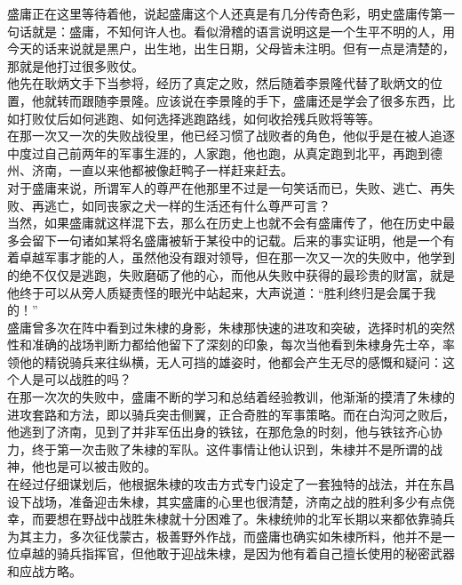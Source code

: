 \begin{multicols}{\theparacolNo}
盛庸正在这里等待着他，说起盛庸这个人还真是有几分传奇色彩，明史盛庸传第一句话就是：盛庸，不知何许人也。看似滑稽的语言说明这是一个生平不明的人，用今天的话来说就是黑户，出生地，出生日期，父母皆未注明。但有一点是清楚的，那就是他打过很多败仗。\\

他先在耿炳文手下当参将，经历了真定之败，然后随着李景隆代替了耿炳文的位置，他就转而跟随李景隆。应该说在李景隆的手下，盛庸还是学会了很多东西，比如打败仗后如何逃跑、如何选择逃跑路线，如何收拾残兵败将等等。\\

在那一次又一次的失败战役里，他已经习惯了战败者的角色，他似乎是在被人追逐中度过自己前两年的军事生涯的，人家跑，他也跑，从真定跑到北平，再跑到德州、济南，一直以来他都被像赶鸭子一样赶来赶去。\\

对于盛庸来说，所谓军人的尊严在他那里不过是一句笑话而已，失败、逃亡、再失败、再逃亡，如同丧家之犬一样的生活还有什么尊严可言？\\

当然，如果盛庸就这样混下去，那么在历史上也就不会有盛庸传了，他在历史中最多会留下一句诸如某将名盛庸被斩于某役中的记载。后来的事实证明，他是一个有着卓越军事才能的人，虽然他没有跟对领导，但在那一次又一次的失败中，他学到的绝不仅仅是逃跑，失败磨砺了他的心，而他从失败中获得的最珍贵的财富，就是他终于可以从旁人质疑责怪的眼光中站起来，大声说道：“胜利终归是会属于我的！”\\

盛庸曾多次在阵中看到过朱棣的身影，朱棣那快速的进攻和突破，选择时机的突然性和准确的战场判断力都给他留下了深刻的印象，每次当他看到朱棣身先士卒，率领他的精锐骑兵来往纵横，无人可挡的雄姿时，他都会产生无尽的感慨和疑问：这个人是可以战胜的吗？\\

在那一次次的失败中，盛庸不断的学习和总结着经验教训，他渐渐的摸清了朱棣的进攻套路和方法，即以骑兵突击侧翼，正合奇胜的军事策略。而在白沟河之败后，他逃到了济南，见到了并非军伍出身的铁铉，在那危急的时刻，他与铁铉齐心协力，终于第一次击败了朱棣的军队。这件事情让他认识到，朱棣并不是所谓的战神，他也是可以被击败的。\\

在经过仔细谋划后，他根据朱棣的攻击方式专门设定了一套独特的战法，并在东昌设下战场，准备迎击朱棣，其实盛庸的心里也很清楚，济南之战的胜利多少有点侥幸，而要想在野战中战胜朱棣就十分困难了。朱棣统帅的北军长期以来都依靠骑兵为其主力，多次征伐蒙古，极善野外作战，而盛庸也确实如朱棣所料，他并不是一位卓越的骑兵指挥官，但他敢于迎战朱棣，是因为他有着自己擅长使用的秘密武器和应战方略。\\


\end{multicols}
